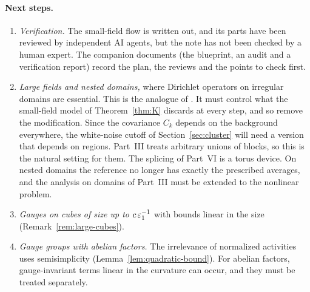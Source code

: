 \paragraph{Next steps.}
\begin{enumerate}[label=(\arabic*)]
\item \emph{Verification.} The small-field flow is written out, and its parts have been reviewed by independent AI agents, but the note has not been checked by a human expert. The companion documents (the blueprint, an audit and a verification report) record the plan, the reviews and the points to check first.
\item \emph{Large fields and nested domains,} where Dirichlet operators on irregular domains are essential. This is the analogue of \cite{DimockII,DimockIII}. It must control what the small-field model of Theorem~\ref{thm:K} discards at every step, and so remove the modification. Since the covariance $C_k$ depends on the background everywhere, the white-noise cutoff of Section~\ref{sec:cluster} will need a version that depends on regions. Part~III treats arbitrary unions of blocks, so this is the natural setting for them. The splicing of Part~VI is a torus device. On nested domains the reference no longer has exactly the prescribed averages, and the analysis on domains of Part~III must be extended to the nonlinear problem.
\item \emph{Gauges on cubes of size up to $c\,\varepsilon_1^{-1}$} with bounds linear in the size (Remark~\ref{rem:large-cubes}).
\item \emph{Gauge groups with abelian factors.} The irrelevance of normalized activities uses semisimplicity (Lemma~\ref{lem:quadratic-bound}). For abelian factors, gauge-invariant terms linear in the curvature can occur, and they must be treated separately.
\end{enumerate}
